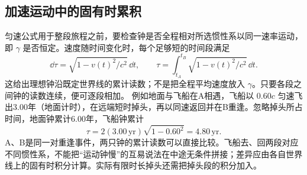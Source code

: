 \subsection{加速运动中的固有时累积}
匀速公式用于整段旅程之前，要检查钟是否全程相对所选惯性系以同一速率运动，即 $\gamma$ 是否恒定。速度随时间变化时，每个足够短的时间段满足
\[
 \dd\tau=\sqrt{1-v(t)^2/c^2}\,\dd t,\qquad
 \tau=\int_{t_A}^{t_B}\sqrt{1-v(t)^2/c^2}\,\dd t.
\]
这给出理想钟沿既定世界线的累计读数；不是把全程平均速度放入 $\gamma$。只要各段之间钟的读数连续，便可逐段相加。
例如地面与飞船在A相遇，飞船以 $0.60c$ 匀速飞出3.00年（地面计时），在远端短时掉头，再以同速返回并在B重逢。忽略掉头所占时间，地面钟累计6.00年，飞船钟累计
\[
 \tau=2(3.00\,\mathrm{yr})\sqrt{1-0.60^2}=4.80\,\mathrm{yr}.
\]
A、B是同一对重逢事件，两只钟的累计读数可以直接比较。飞船去、回两段对应不同惯性系，不能把“运动钟慢”的互易说法在中途无条件拼接；差异应由各自世界线上的固有时积分计算。实际有限时长掉头还需把掉头段的积分加入。
